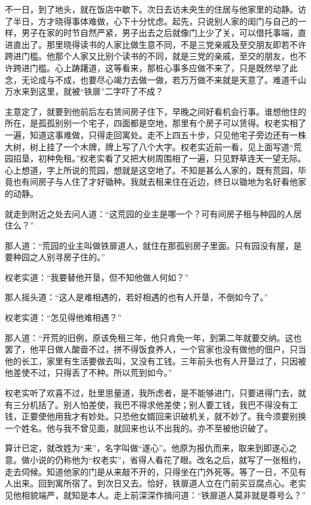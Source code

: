 \documentclass[a4paper,12pt,UTF8,twoside]{ctexbook}
\begin{document}
不一日，到了地头，就在饭店中歇下。次日去访未央生的住居与他家里的动静。访了半日，方才晓得事体难做，心下十分忧虑。起先，只说别人家的闺门与自己的一样，男子在家的时节自然严紧，男子出去之后就像门上少了关，可以借托事端，直进直出了。那里晓得读书的人家比做生意不同，不是三党亲戚及至交朋友即若不许跨进门槛。他那个人家又比别个读书的不同，就是三党的亲戚，至交的朋友，也不许跨进门槛。心上踌躇道，这等看来，那桩心事多应做不来了，只是既然举了此念，无论成与不成，也要尽心竭力去做一做，若万万做不来就是天意了。难道千山万水来到这里，就被“铁扉”二字吓了不成？

主意定了，就要到他前后左右赁间房子住下，早晚之间好看机会行事。谁想他住的所在，是孤孤别别一个宅子，四面都是空地，那里有个房子可以赁得。权老实相了一遍，知道这事难做，只得走回寓处。走不上四五十步，只见他宅子旁边还有一株大树，树上挂了一个木牌，牌上写了八个大字。权老实近前一看，见上面写道“荒园招垦，初种免租。”权老实看了又把大树周围相了一遍，只见野草连天一望无际。心上想道，字上所说的荒园，想就是这空地了。不知是甚么人家的，既有荒园，毕竟也有间房子与人住了才好锄种。我就去租来住在近边，终日以锄地为名好看他家的动静。

就走到附近之处去问人道：“这荒园的业主是哪一个？可有间房子租与种园的人居住么？”

那人道：“荒园的业主叫做铁扉道人，就住在那孤别房子里面。只有园没有屋，是要种园之人别寻房子住的。”

权老实道：“我要替他开垦，但不知他做人何如？”

那人摇头道：“这人是难相遇的，若好相遇的也有人开垦，不倒如今了。”

权老实道：“怎见得他难相遇？”

那人道：“开荒的旧例，原该免租三年，他只肯免一年，到第二年就要交纳。这也罢了，他平日做人酸啬不过，拼不得饭食养人，一个官家也没有做他的佃户，只当他的长工，家里有生活要做去叫，又没有工钱。三年前头也有人开垦过了，只因被他差使不过，只得丢了不种。所以荒到如今。”

权老实听了欢喜不过，肚里思量道，我所虑者，是不能够进门，只要进得门去，就有三分机括了。别人怕差使，我巴不得求他差使；别人要工钱，我巴不得没有工钱，正要使他用我才有妙处。只恐他女婿回来识破机关，就不妙了。我今须要别换一个姓名。他与我不曾见面，就回来也认不出我的。亦不至被他识破了。

算计已定，就改姓为“来”，名字叫做“遂心”。他原为报仇而来，取来到即遂心之意。做小说的仍称他为“权老实”，省得人看花了眼。改名之后，就写了一张租约，走去伺候。知道他家的门是从来敲不开的，只得坐在门外死等。等了一日，不见有人出来。回到寓所宿了。到次日又去。恰好，铁扉道人立在门前买豆腐点心。老实见他相貌端严，就知是本人。走上前深深作揖问道：“铁扉道人莫非就是尊号么？”
\end{document}
